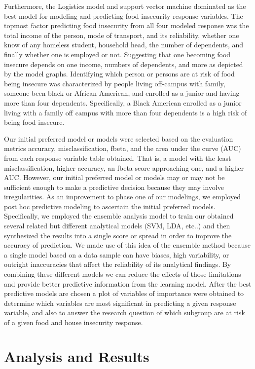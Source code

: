 \documentclass[
  10pt,
]{article}
\begin{document}
Furthermore, the Logistics model and support vector machine dominated as the best model for modeling and predicting food insecurity response variables. The topmost factor predicting food insecurity from all four modeled response was the total income of the person, mode of transport, and its reliability, whether one know of any homeless student, household head, the number of dependents, and finally whether one is employed or not. Suggesting that one becoming food insecure depends on one income, numbers of dependents, and more as depicted by the model graphs. Identifying which person or persons are at risk of food being insecure was characterized by people living off-campus with family, someone been black or African American, and enrolled as a junior and having more than four dependents. Specifically, a Black American enrolled as a junior living with a family off campus with more than four dependents is a high risk of being food insecure.

Our initial preferred model or models were selected based on the evaluation metrics accuracy, misclassification, fbeta, and the area under the curve (AUC) from each response variable table obtained. That is, a model with the least misclassification, higher accuracy, an fbeta score approaching one, and a higher AUC. However, our initial preferred model or models may or may not be sufficient enough to make a predictive decision because they may involve irregularities. As an improvement to phase one of our modelings, we employed post hoc predictive modeling to ascertain the initial preferred models. Specifically, we employed the ensemble analysis model to train our obtained several related but different analytical models (SVM, LDA, etc..) and then synthesized the results into a single score or spread in order to improve the accuracy of prediction. We made use of this idea of the ensemble method because a single model based on a data sample can have biases, high variability, or outright inaccuracies that affect the reliability of its analytical findings. By combining these different models we can reduce the effects of those limitations and provide better predictive information from the learning model. After the best predictive models are chosen a plot of variables of importance were obtained to determine which variables are most significant in predicting a given response variable, and also to answer the research question of which subgroup are at risk of a given food and house insecurity response.

\hypertarget{analysis-and-results}{%
\section{Analysis and Results}\label{analysis-and-results}}
\end{document}
